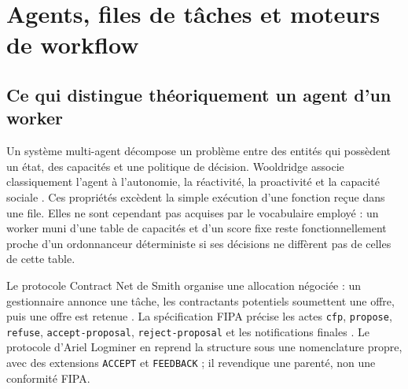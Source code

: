 
\section{Agents, files de tâches et moteurs de workflow}

\subsection{Ce qui distingue théoriquement un agent d'un worker}

Un système multi-agent décompose un problème entre des entités qui possèdent un état,
des capacités et une politique de décision. Wooldridge associe classiquement l'agent à
l'autonomie, la réactivité, la proactivité et la capacité sociale
\cite{wooldridge2009introduction}. Ces propriétés excèdent la simple exécution d'une
fonction reçue dans une file. Elles ne sont cependant pas acquises par le vocabulaire
employé : un worker muni d'une table de capacités et d'un score fixe reste
fonctionnellement proche d'un ordonnanceur déterministe si ses décisions ne diffèrent pas
de celles de cette table.

Le protocole Contract Net de Smith organise une allocation négociée : un gestionnaire
annonce une tâche, les contractants potentiels soumettent une offre, puis une offre est
retenue \cite{smith1980contract}. La spécification FIPA précise les actes
\texttt{cfp}, \texttt{propose}, \texttt{refuse}, \texttt{accept-proposal},
\texttt{reject-proposal} et les notifications finales
\cite{fipa2002contractnet,fipa2002aclmessage,fipa2002cal}. Le protocole d'Ariel Logminer
en reprend la structure sous une nomenclature propre, avec des extensions
\texttt{ACCEPT} et \texttt{FEEDBACK} ; il revendique une parenté, non une conformité
FIPA.

